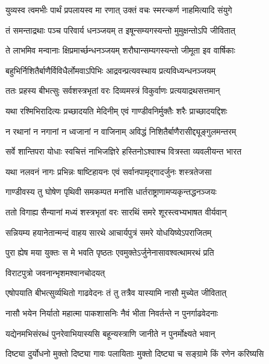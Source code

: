 \twolineshloka
{युव्यस्व त्वमभीः पार्थं प्रपलायस्व मा रणात्}
{उक्तं वचः स्मरन्कर्ण नाहमित्यादि संयुगे}



\twolineshloka
{तं समन्ताद्रथाः पञ्च परिवार्य धनञ्जयम्}
{त इषून्सम्यगस्यन्तो मुमुक्षन्तोऽपि जीवितात्}


\twolineshloka
{ते लाभमिव मन्वानाः क्षिप्रमार्च्छन्धनञ्जयम्}
{शरौघान्सम्यगस्यन्तो जीमूता इव वार्षिकाः}


\twolineshloka
{बहुभिर्निशितैर्बाणैर्विविधैर्लोमवाऽपिभिः}
{आद्रवन्प्रत्यवस्थाय प्रत्यविध्यन्धनञ्जयम्}


\twolineshloka
{ततः प्रहस्य बीभत्सुः सर्वशस्त्रभृतां वरः}
{दिव्यमस्त्रं विकुर्वाणः प्रत्ययाद्रथसत्तमान्}


\twolineshloka
{यथा रश्मिभिरादित्यः प्रच्छादयति मेदिनीम्}
{एवं गाण्डीवनिर्मुक्तैः शरैः प्राच्छादयद्दिशः}


\twolineshloka
{न रथानां न नगानां न ध्वजानां न वाजिनाम्}
{अविद्धं निशितैर्बाणैरासीद्द्यूङ्गुलमन्तरम्}


\twolineshloka
{सर्वे शान्तिपरा योधाः स्वचित्तं नाभिजज्ञिरे}
{हस्तिनोऽश्वाश्च वित्रस्ता व्यवलीयन्त भारत}


\twolineshloka
{यथा नलवनं नागः प्रभिन्नः षाष्टिहायनः}
{एवं सर्वानपामृद्गादर्जुनः शस्त्रतेजसा}


\twolineshloka
{गाण्डीवस्य तु घोषेण पृथिवी समकम्पत}
{मनांसि धार्तराष्ट्राणामप्यकृन्तद्धनञ्जयः}


\twolineshloka
{ततो विगाह्य सैन्यानां मध्यं शस्त्रभृतां वरः}
{सारथिं समरे शूरस्त्वभ्यभाषत वीर्यवान्}


\twolineshloka
{सन्नियम्य हयानेतान्मन्दं वाहय सारथे}
{आचार्यपुत्रं समरे योधयिष्येऽपराजितम्}


\twolineshloka
{पुरा ह्येष मया युक्तः स मे भवति पृष्ठतः}
{एवमुक्तेऽर्जुनेनासावश्वत्थामरथं प्रति}


\onelineshloka
{विराटपुत्रो जवनान्भृशमश्वानचोदयत्}




\twolineshloka
{एषोपयाति बीभत्सुर्व्यथितो गाढवेदनः}
{तं तु तत्रैव यास्यामि नासौ मुच्येत जीवितात्}




\twolineshloka
{नासौ भयेन निर्यातो महात्मा पाकशासनिः}
{नैवं भीता निवर्तन्ते न पुनर्गाढवेदनाः}


\twolineshloka
{यद्येनमभिसंरब्धं पुनरेवाभियास्यसि}
{बहून्यस्त्राणि जानीते न पुनर्मोक्ष्यते भवान्}


\twolineshloka
{दिष्ट्या दुर्योधनो मुक्तो दिष्ट्या गावः पलायिताः}
{मुक्तो दिष्ट्या च सङ्ग्रामे किं रणेन करिष्यसि}


